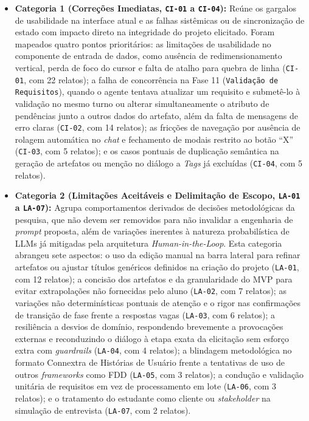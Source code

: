 \begin{itemize}
    \item \textbf{Categoria 1 (Correções Imediatas, \texttt{CI-01} a \texttt{CI-04}):} Reúne os gargalos de usabilidade na interface atual e as falhas sistêmicas ou de sincronização de estado com impacto direto na integridade do projeto elicitado. Foram mapeados quatro pontos prioritários: as limitações de usabilidade no componente de entrada de dados, como ausência de redimensionamento vertical, perda de foco do cursor e falta de atalho para quebra de linha (\texttt{CI-01}, com 22 relatos); a falha de concorrência na Fase 11 (\texttt{Validação de Requisitos}), quando o agente tentava atualizar um requisito e submetê-lo à validação no mesmo turno ou alterar simultaneamente o atributo de pendências junto a outros dados do artefato, além da falta de mensagens de erro claras (\texttt{CI-02}, com 14 relatos); as fricções de navegação por ausência de rolagem automática no \textit{chat} e fechamento de modais restrito ao botão ``X'' (\texttt{CI-03}, com 5 relatos); e os casos pontuais de duplicação semântica na geração de artefatos ou menção no diálogo a \textit{Tags} já excluídas (\texttt{CI-04}, com 5 relatos).
    \item \textbf{Categoria 2 (Limitações Aceitáveis e Delimitação de Escopo, \texttt{LA-01} a \texttt{LA-07}):} Agrupa comportamentos derivados de decisões metodológicas da pesquisa, que não devem ser removidos para não invalidar a engenharia de \textit{prompt} proposta, além de variações inerentes à natureza probabilística de LLMs já mitigadas pela arquitetura \textit{Human-in-the-Loop}. Esta categoria abrangeu sete aspectos: o uso da edição manual na barra lateral para refinar artefatos ou ajustar títulos genéricos definidos na criação do projeto (\texttt{LA-01}, com 12 relatos); a concisão dos artefatos e da granularidade do MVP para evitar extrapolações não fornecidas pelo aluno (\texttt{LA-02}, com 7 relatos); as variações não determinísticas pontuais de atenção e o rigor nas confirmações de transição de fase frente a respostas vagas (\texttt{LA-03}, com 6 relatos); a resiliência a desvios de domínio, respondendo brevemente a provocações externas e reconduzindo o diálogo à etapa exata da elicitação sem esforço extra com \textit{guardrails} (\texttt{LA-04}, com 4 relatos); a blindagem metodológica no formato Connextra de Histórias de Usuário frente a tentativas de uso de outros \textit{frameworks} como FDD (\texttt{LA-05}, com 3 relatos); a condução e validação unitária de requisitos em vez de processamento em lote (\texttt{LA-06}, com 3 relatos); e o tratamento do estudante como cliente ou \textit{stakeholder} na simulação de entrevista (\texttt{LA-07}, com 2 relatos).

\end{itemize}
